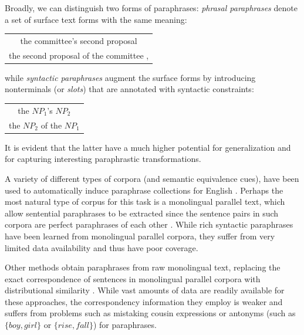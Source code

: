 \documentclass[11pt]{article}
\begin{document}
Broadly, we can distinguish two forms of paraphrases: \emph{phrasal
  paraphrases} denote a set of surface text forms with the same
meaning:
\begin{center}
\begin{tabular}{c}
the committee's second proposal \\
the second proposal of the committee ,
\end{tabular}
\end{center}
while \emph{syntactic paraphrases} augment the surface forms by
introducing nonterminals (or \emph{slots}) that are annotated with
syntactic constraints:
\begin{center}
\begin{tabular}{c}
the $\mathit{NP}_1$'s $\mathit{NP}_2$ \\
the $\mathit{NP}_2$ of the $\mathit{NP}_1$
\end{tabular}
\end{center}
It is evident that the latter have a much higher potential for
generalization and for capturing interesting paraphrastic transformations.

A variety of different types of corpora (and semantic equivalence
cues), have been used to automatically induce paraphrase collections
for English \cite{Madnani2010}. Perhaps the most natural type of
corpus for this task is a monolingual parallel text, which allow
sentential paraphrases to be extracted since the
sentence pairs in such corpora are perfect paraphrases of each other
\cite{Barzilay2001,Pang2003}. While rich syntactic paraphrases have
been learned from monolingual parallel corpora, they suffer from very limited data
availability and thus have poor coverage.

Other methods obtain paraphrases from raw monolingual text,
replacing the exact correspondence of sentences in monolingual
parallel corpora with distributional similarity
\cite{Lin2001,Bhagat2008}. While vast amounts of data are readily
available for these approaches, the correspondency information they
employ is weaker and suffers from problems such as mistaking cousin
expressions or antonyms (such as $\{\mathit{boy}, \mathit{girl}\}$ or
$\{\mathit{rise}, \mathit{fall}\}$) for paraphrases.
\end{document}
